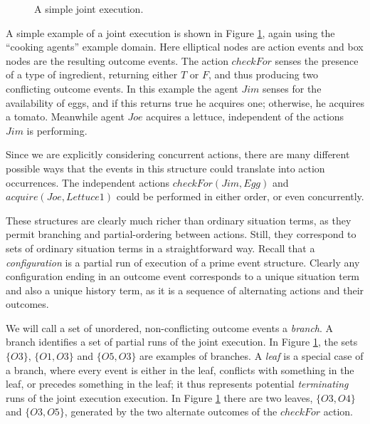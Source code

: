 %
\begin{figure}[!b]

\caption{A simple joint execution.}


\label{fig:example-je} 
\end{figure}


A simple example of a joint execution is shown in Figure \ref{fig:example-je},
again using the {}``cooking agents'' example domain. Here elliptical
nodes are action events and box nodes are the resulting outcome events.
The action $checkFor$ senses the presence of a type of ingredient,
returning either $T$ or $F$, and thus producing two conflicting
outcome events. In this example the agent $Jim$ senses for the availability
of eggs, and if this returns true he acquires one; otherwise, he acquires
a tomato. Meanwhile agent $Joe$ acquires a lettuce, independent of
the actions $Jim$ is performing.

Since we are explicitly considering concurrent actions, there are
many different possible ways that the events in this structure could
translate into action occurrences. The independent actions $checkFor(Jim,Egg)$
and $acquire(Joe,Lettuce1)$ could be performed in either order, or
even concurrently.

These structures are clearly much richer than ordinary situation terms,
as they permit branching and partial-ordering between actions. Still,
they correspond to sets of ordinary situation terms in a straightforward
way. Recall that a \emph{configuration} is a partial run of execution
of a prime event structure. Clearly any configuration ending in an
outcome event corresponds to a unique situation term and also a unique
history term, as it is a sequence of alternating actions and their
outcomes.

We will call a set of unordered, non-conflicting outcome events a
\emph{branch}. A branch identifies a set of partial runs of the joint
execution. In Figure \ref{fig:example-je}, the sets $\{O3\}$, $\{O1,O3\}$
and $\{O5,O3\}$ are examples of branches. A \emph{leaf} is a special
case of a branch, where every event is either in the leaf, conflicts
with something in the leaf, or precedes something in the leaf; it
thus represents potential \emph{terminating} runs of the joint execution
execution. In Figure \ref{fig:example-je} there are two leaves, $\{O3,O4\}$
and $\{O3,O5\}$, generated by the two alternate outcomes of the $checkFor$
action.


